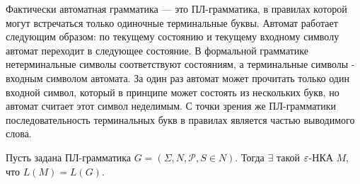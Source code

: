 Фактически автоматная грамматика --- это ПЛ-грамматика, в правилах которой могут встречаться только одиночные терминальные буквы.
Автомат работает следующим образом: по текущему состоянию и текущему входному символу автомат переходит в следующее состояние. В формальной грамматике нетерминальные символы соответствуют состояниям, а терминальные символы - входным символом автомата. За один раз автомат может прочитать только один входной символ, который в принципе может состоять из нескольких букв, но автомат считает этот символ неделимым. С точки зрения же ПЛ-грамматики последовательность терминальных букв в правилах является частью выводимого слова.
\begin{mylemma}
\label{lemma-pl-to-nka}
Пусть задана ПЛ-грамматика $G = (\Sigma, N, \mathcal P, S \in N)$. Тогда $\exists$ такой $\varepsilon$-НКА $M$, что $L(M) = L(G)$.
\end{mylemma}
